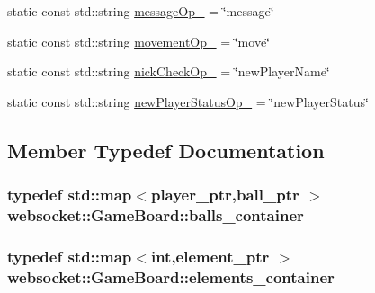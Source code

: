 \begin{DoxyCompactItemize}
\item 
static const std\+::string \hyperlink{classwebsocket_1_1GameBoard_a27fc2053eae7a0bdc4ec6cb7ff92502e}{message\+Op\+\_\+} = \char`\"{}message\char`\"{}
\item 
static const std\+::string \hyperlink{classwebsocket_1_1GameBoard_ac5eba2bf19bde163ea767906c8e2c61c}{movement\+Op\+\_\+} = \char`\"{}move\char`\"{}
\item 
static const std\+::string \hyperlink{classwebsocket_1_1GameBoard_a55afbbb9d15f4815427d2f20ca6674cd}{nick\+Check\+Op\+\_\+} = \char`\"{}new\+Player\+Name\char`\"{}
\item 
static const std\+::string \hyperlink{classwebsocket_1_1GameBoard_af28eae4479ca907c062495b7ec2925c1}{new\+Player\+Status\+Op\+\_\+} = \char`\"{}new\+Player\+Status\char`\"{}
\end{DoxyCompactItemize}


\subsection{Member Typedef Documentation}
\subsubsection[{\texorpdfstring{balls\+\_\+container}{balls_container}}]{\setlength{\rightskip}{0pt plus 5cm}typedef std\+::map$<${\bf player\+\_\+ptr},{\bf ball\+\_\+ptr} $>$ {\bf websocket\+::\+Game\+Board\+::balls\+\_\+container}\hspace{0.3cm}{\ttfamily [private]}}\hypertarget{classwebsocket_1_1GameBoard_a49ec88dacda0efb3448649503967e07d}{}\label{classwebsocket_1_1GameBoard_a49ec88dacda0efb3448649503967e07d}
\subsubsection[{\texorpdfstring{elements\+\_\+container}{elements_container}}]{\setlength{\rightskip}{0pt plus 5cm}typedef std\+::map$<$int,{\bf element\+\_\+ptr} $>$ {\bf websocket\+::\+Game\+Board\+::elements\+\_\+container}\hspace{0.3cm}{\ttfamily [private]}}\hypertarget{classwebsocket_1_1GameBoard_a6340e99ab84e0fc9ee504f5874073c0c}{}\label{classwebsocket_1_1GameBoard_a6340e99ab84e0fc9ee504f5874073c0c}
